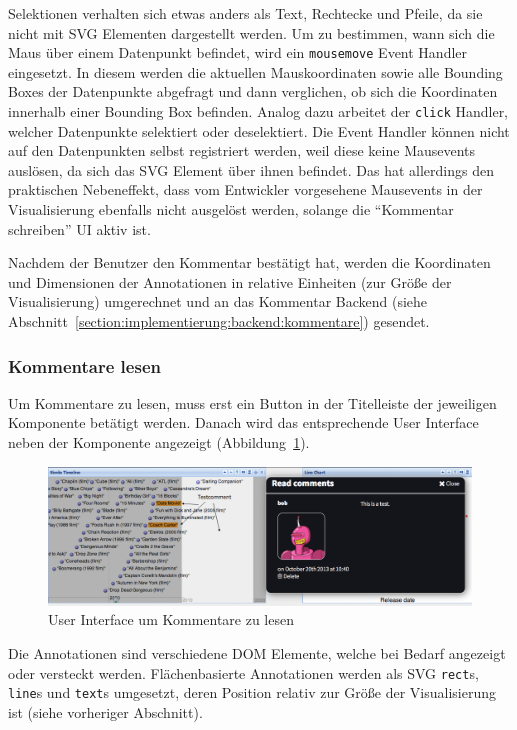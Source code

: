 \documentclass[
	headsepline,
	footsepline,
	fontsize=12pt,
	bibliography=totoc
]{scrbook}
\begin{document}
Selektionen verhalten sich etwas anders als Text, Rechtecke und Pfeile, da sie nicht mit SVG Elementen dargestellt werden. Um zu bestimmen, wann sich die Maus über einem Datenpunkt befindet, wird ein \texttt{mousemove} Event Handler eingesetzt. In diesem werden die aktuellen Mauskoordinaten sowie alle Bounding Boxes der Datenpunkte abgefragt und dann verglichen, ob sich die Koordinaten innerhalb einer Bounding Box befinden. Analog dazu arbeitet der \texttt{click} Handler, welcher Datenpunkte selektiert oder deselektiert. Die Event Handler können nicht auf den Datenpunkten selbst registriert werden, weil diese keine Mausevents auslösen, da sich das SVG Element über ihnen befindet. Das hat allerdings den praktischen Nebeneffekt, dass vom Entwickler vorgesehene Mausevents in der Visualisierung ebenfalls nicht ausgelöst werden, solange die \enquote{Kommentar schreiben} UI aktiv ist.

Nachdem der Benutzer den Kommentar bestätigt hat, werden die Koordinaten und Dimensionen der Annotationen in relative Einheiten (zur Größe der Visualisierung) umgerechnet und an das Kommentar Backend (siehe Abschnitt~\ref{section:implementierung:backend:kommentare}) gesendet.

\subsubsection{Kommentare lesen}

Um Kommentare zu lesen, muss erst ein Button in der Titelleiste der jeweiligen Komponente betätigt werden. Danach wird das entsprechende User Interface neben der Komponente angezeigt (Abbildung~\ref{figure:ui-read-comments}).

\begin{figure}[htbp]
   \centering
   \includegraphics[width=\textwidth]{images/implementierung-ui-read-comments.png}
   \caption{User Interface um Kommentare zu lesen}
   \label{figure:ui-read-comments}
\end{figure}

Die Annotationen sind verschiedene DOM Elemente, welche bei Bedarf angezeigt oder versteckt werden. Flächenbasierte Annotationen werden als SVG \texttt{rect}s, \texttt{line}s und \texttt{text}s umgesetzt, deren Position relativ zur Größe der Visualisierung ist (siehe vorheriger Abschnitt).
\end{document}
